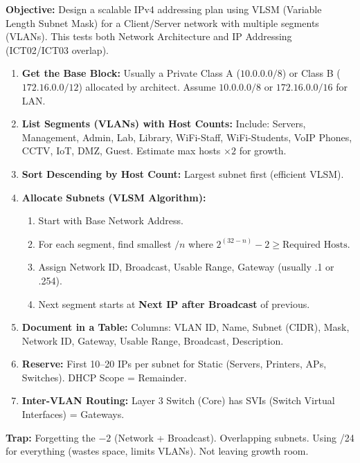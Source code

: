 \documentclass[11pt]{article}
\begin{document}
\begin{methode}
\textbf{Objective:} Design a scalable IPv4 addressing plan using VLSM (Variable Length Subnet Mask) for a Client/Server network with multiple segments (VLANs). This tests both Network Architecture and IP Addressing (ICT02/ICT03 overlap).

\begin{enumerate}
    \item \textbf{Get the Base Block:} Usually a Private Class A ($10.0.0.0/8$) or Class B ($172.16.0.0/12$) allocated by architect. Assume $10.0.0.0/8$ or $172.16.0.0/16$ for LAN.
    \item \textbf{List Segments (VLANs) with Host Counts:} Include: Servers, Management, Admin, Lab, Library, WiFi-Staff, WiFi-Students, VoIP Phones, CCTV, IoT, DMZ, Guest. Estimate max hosts $\times 2$ for growth.
    \item \textbf{Sort Descending by Host Count:} Largest subnet first (efficient VLSM).
    \item \textbf{Allocate Subnets (VLSM Algorithm):}
    \begin{enumerate}
        \item Start with Base Network Address.
        \item For each segment, find smallest $/n$ where $2^{(32-n)} - 2 \ge \text{Required Hosts}$.
        \item Assign Network ID, Broadcast, Usable Range, Gateway (usually .1 or .254).
        \item Next segment starts at \textbf{Next IP after Broadcast} of previous.
    \end{enumerate}
    \item \textbf{Document in a Table:} Columns: VLAN ID, Name, Subnet (CIDR), Mask, Network ID, Gateway, Usable Range, Broadcast, Description.
    \item \textbf{Reserve:} First 10--20 IPs per subnet for Static (Servers, Printers, APs, Switches). DHCP Scope = Remainder.
    \item \textbf{Inter-VLAN Routing:} Layer 3 Switch (Core) has SVIs (Switch Virtual Interfaces) = Gateways.
\end{enumerate}
\textbf{Trap:} Forgetting the $-2$ (Network + Broadcast). Overlapping subnets. Using /24 for everything (wastes space, limits VLANs). Not leaving growth room.
\end{methode}
\end{document}
